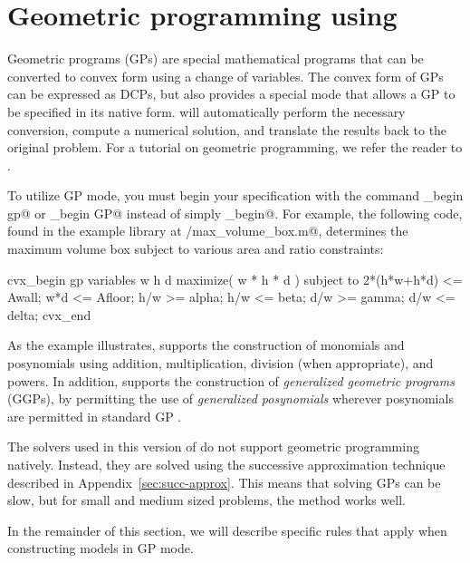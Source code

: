 \documentclass[12pt]{article}
\begin{document}
\newpage
\section{Geometric programming using \cvx}
\label{sec:gpmode}

Geometric programs (GPs) are special mathematical programs 
that can be converted to convex form using a change of variables.
The convex form of GPs can be expressed as DCPs, but \cvx also 
provides a special mode that allows a GP to be specified in 
its native form. \cvx will automatically perform the necessary
conversion, compute a numerical solution, and translate the results
back to the original problem.
For a tutorial on geometric programming,
we refer the reader to \cite{BKVH:05}.

To utilize GP mode, you must begin your \cvx specification
with the command \verb@cvx_begin gp@ or \verb@cvx_begin GP@ instead of simply
\verb@cvx_begin@. For example,
the following code, found in the example library at \verb@gp/max_volume_box.m@,
determines the maximum volume box subject to
various area and ratio constraints:
\begin{code}
	cvx_begin gp
	    variables w h d
	    maximize( w * h * d )
	    subject to
	        2*(h*w+h*d) <= Awall;
	        w*d <= Afloor;
	        h/w >= alpha;
	        h/w <= beta;
	        d/w >= gamma;
	        d/w <= delta;
	cvx_end
\end{code}
As the example illustrates, \cvx supports the construction of monomials and
posynomials using addition, multiplication, division (when appropriate),
and powers. In addition, \cvx supports the construction of \emph{generalized
geometric programs} (GGPs), by permitting the use of \emph{generalized
posynomials} wherever posynomials are permitted in standard GP \cite{BKVH:05}.

The solvers used in this version of \cvx do
not support geometric programming natively. Instead, they are solved using the
successive approximation technique described in
Appendix~\ref{sec:succ-approx}.  This means that solving GPs can be slow,
but for small and medium sized problems, the method works well.

In the remainder of this section, we will describe specific rules
that apply when constructing models in GP mode.
\end{document}
